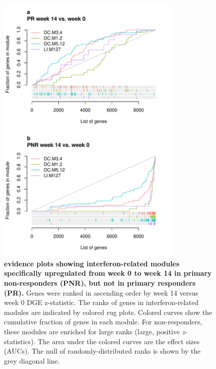 \begin{figure}
    \centering
    \includegraphics[width=0.8\textwidth,page=1]{mainmatter/figures/chapter_04/plot_gene_set_enrichment.evidencePlots_C_3_1_Interferon.pdf}
    \caption{
        \textbf{ evidence plots showing interferon-related modules specifically upregulated from week 0 to week 14 in primary non-responders (PNR), but not in primary responders (PR).}
        Genes were ranked in ascending order by week 14 versus week 0 \gls{DGE} z-statistic. 
        The ranks of genes in interferon-related modules are indicated by colored rug plots. 
        Colored curves show the cumulative fraction of genes in each module. 
        For non-responders, these modules are enriched for large ranks (large, positive $z$-statistics). 
        The area under the colored curves are the effect sizes (\glspl{AUC}). 
        The null of randomly-distributed ranks is shown by the grey diagonal line.
    }
    \label{fig:multipants_dge_evidencePlots_C_3_1_Interferon}
\end{figure}


